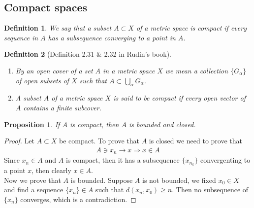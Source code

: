\documentclass[12pt,leqno]{amsart}
\newtheorem{definition}{Definition}[section]
\newtheorem{proposition}{Proposition}[section]
\theoremstyle{definition}
\numberwithin{equation}{subsection}
\begin{document}
\medskip

\subsection{Compact spaces}
\begin{definition}
We say that a subset $A\subset X$ of a metric space is compact if every sequence in $A$ has a subsequence converging to a point in $A$.
\end{definition}

\begin{definition}[Definition 2.31 \& 2.32 in Rudin's book]
$ $
\begin{enumerate}
    \item By an open cover of a set $A$ in a metric space $X$ we mean a collection $\{G_\alpha\}$ of open subsets of $X$ such that $A\subset \bigcup_\alpha G_\alpha$.
    \item A subset $A$ of a metric space $X$ is said to be compact if every open vector of $A$ contains a finite subcover.
\end{enumerate}
\end{definition}

\begin{proposition}
If $A$ is compact, then $A$ is bounded and closed.
\end{proposition}
\begin{proof}
Let $A\subset X$ be compact. To prove that $A$ is closed we need to prove that 
\begin{align*}
    A\ni x_n\to x \Rightarrow x\in A
\end{align*}
Since $x_n\in A$ and $A$ is compact, then it has a subsequence $\{x_{n_k}\}$ convergenting to a point $x$, then clearly $x\in A$. \\
\hspace*{3em}Now we prove that $A$ is bounded. Suppose $A$ is not bounded, we fixed $x_0\in X$ and find a sequence $\{x_n\}\in A$ such that $d(x_n, x_0) \geq n$. Then no subsequence of $\{x_n\}$ converges, which is a contradiction.
\end{proof}
\end{document}
